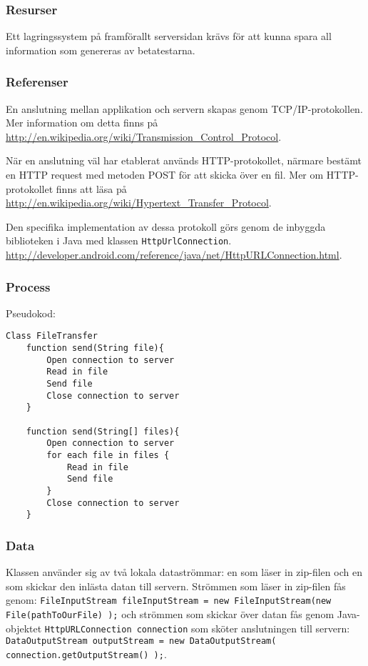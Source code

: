 \subsubsection{Resurser}
Ett lagringssystem på framförallt serversidan krävs för att kunna spara all information som genereras av betatestarna. 

\subsubsection{Referenser}
En anslutning mellan applikation och servern skapas genom TCP/IP-protokollen. Mer information om detta finns på \url{http://en.wikipedia.org/wiki/Transmission_Control_Protocol}.

När en anslutning väl har etablerat används HTTP-protokollet, närmare bestämt en HTTP request med metoden POST för att skicka över en fil. Mer om HTTP-protokollet finns att läsa på \url{http://en.wikipedia.org/wiki/Hypertext_Transfer_Protocol}. 

Den specifika implementation av dessa protokoll görs genom de inbyggda biblioteken i Java med klassen \verb:HttpUrlConnection:. \url{http://developer.android.com/reference/java/net/HttpURLConnection.html}. 

\subsubsection{Process}
Pseudokod: 
\begin{verbatim}
Class FileTransfer
	function send(String file){
		Open connection to server
		Read in file
		Send file
		Close connection to server
	}
	
	function send(String[] files){
		Open connection to server
		for each file in files {
			Read in file
			Send file		
		}
		Close connection to server
	}
\end{verbatim}

\subsubsection{Data}
Klassen använder sig av två lokala dataströmmar: en som läser in zip-filen och en som skickar den inlästa datan till servern. Strömmen som läser in zip-filen fås genom: \verb:FileInputStream fileInputStream = new FileInputStream(new File(pathToOurFile) );: och strömmen som skickar över datan fås genom Java-objektet \verb:HttpURLConnection connection: som sköter anslutningen till servern: \verb:DataOutputStream outputStream = new DataOutputStream( connection.getOutputStream() );:. 